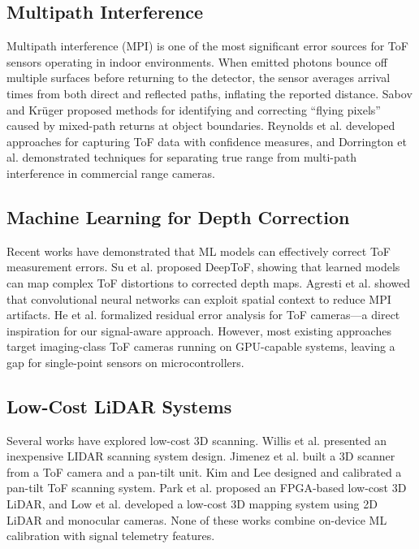\documentclass[12pt,a4paper]{article}
\begin{document}
    \subsection{Multipath Interference}

    Multipath interference (MPI) is one of the most significant error sources for ToF sensors operating in indoor environments. When emitted photons bounce off multiple surfaces before returning to the detector, the sensor averages arrival times from both direct and reflected paths, inflating the reported distance. Sabov and Kr\"uger \cite{sabov2008identification} proposed methods for identifying and correcting ``flying pixels'' caused by mixed-path returns at object boundaries. Reynolds et al. \cite{reynolds2011capturing} developed approaches for capturing ToF data with confidence measures, and Dorrington et al. \cite{dorrington2011separating} demonstrated techniques for separating true range from multi-path interference in commercial range cameras.

    \subsection{Machine Learning for Depth Correction}

    Recent works have demonstrated that ML models can effectively correct ToF measurement errors. Su et al. \cite{su2018deeptof} proposed DeepToF, showing that learned models can map complex ToF distortions to corrected depth maps. Agresti et al. \cite{agresti2018deep} showed that convolutional neural networks can exploit spatial context to reduce MPI artifacts. He et al. \cite{he2017depth} formalized residual error analysis for ToF cameras---a direct inspiration for our signal-aware approach. However, most existing approaches target imaging-class ToF cameras running on GPU-capable systems, leaving a gap for single-point sensors on microcontrollers.

    \subsection{Low-Cost LiDAR Systems}

    Several works have explored low-cost 3D scanning. Willis et al. \cite{willis2009design} presented an inexpensive LIDAR scanning system design. Jimenez et al. \cite{jimenez20143d} built a 3D scanner from a ToF camera and a pan-tilt unit. Kim and Lee \cite{kim2015design} designed and calibrated a pan-tilt ToF scanning system. Park et al. \cite{fpga2019lowcost} proposed an FPGA-based low-cost 3D LiDAR, and Low et al. \cite{low2024cost3d} developed a low-cost 3D mapping system using 2D LiDAR and monocular cameras. None of these works combine on-device ML calibration with signal telemetry features.
\end{document}
